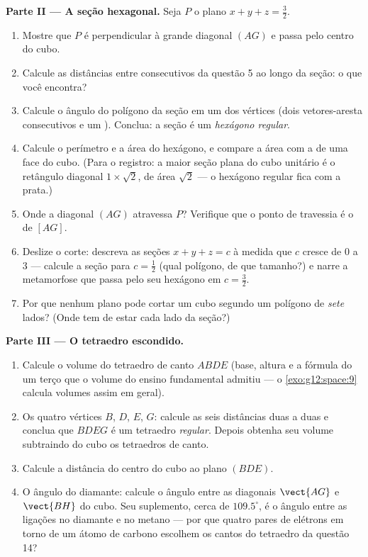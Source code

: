 \begin{problem}
\medskip
\noindent\textbf{Parte II --- A seção hexagonal.}
Seja $P$ o plano $x + y + z = \frac32$.
\begin{enumerate}[resume]
  \item Mostre que $P$ é perpendicular à grande diagonal
        $(AG)$ e passa pelo centro do cubo.
  \item Calcule as distâncias entre  consecutivos
        da questão 5 ao longo da seção: o que você encontra?
  \item Calcule o ângulo do polígono da seção em um dos
        vértices (dois vetores-aresta consecutivos e um ). Conclua: a seção é um \emph{hexágono
        regular}.
  \item Calcule o perímetro e a área do hexágono, e compare a
        área com a de uma face do cubo. (Para o registro: a
        maior seção plana do cubo unitário é o retângulo
        diagonal $1 \times \sqrt2$, de área $\sqrt2$ --- o
        hexágono regular fica com a prata.)
  \item Onde a diagonal $(AG)$ atravessa $P$? Verifique que o
        ponto de travessia é o  de $[AG]$.
  \item Deslize o corte: descreva as seções
        $x + y + z = c$ à medida que $c$ cresce de $0$ a $3$ ---
        calcule a seção para $c = \frac12$ (qual polígono, de
        que tamanho?) e narre a metamorfose que passa pelo seu
        hexágono em $c = \frac32$.
  \item Por que nenhum plano pode cortar um cubo segundo um
        polígono de \emph{sete} lados? (Onde tem de estar cada
        lado da seção?)
\end{enumerate}

\medskip
\noindent\textbf{Parte III --- O tetraedro escondido.}
\begin{enumerate}[resume]
  \item Calcule o volume do tetraedro de canto $ABDE$ (base,
        altura e a fórmula do um terço que o volume do ensino
        fundamental admitiu --- o \cref{exo:g12:space:9}
        calcula volumes assim em geral).
  \item Os quatro vértices $B$, $D$, $E$, $G$: calcule as seis
        distâncias duas a duas e conclua que $BDEG$ é um
        tetraedro \emph{regular}. Depois obtenha seu volume
        subtraindo do cubo os tetraedros de canto.
  \item Calcule a distância do centro do cubo ao plano $(BDE)$.
  \item O ângulo do diamante: calcule o ângulo entre as
        diagonais $\vect{AG}$ e $\vect{BH}$ do cubo. Seu
        suplemento, cerca de $109.5^\circ$, é o ângulo entre as
        ligações no diamante e no metano --- por que quatro
        pares de elétrons em torno de um átomo de carbono
        escolhem os cantos do tetraedro da questão 14?
\end{enumerate}


\end{problem}
